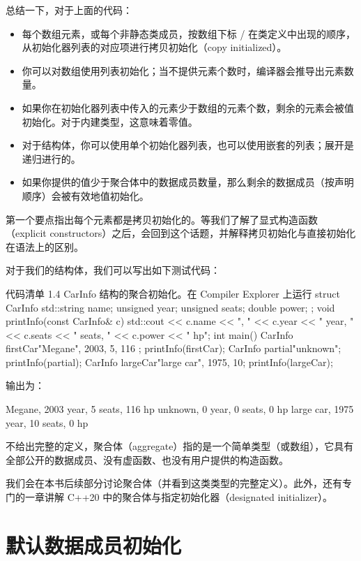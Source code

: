 总结一下，对于上面的代码：

\begin{itemize}
\item 每个数组元素，或每个非静态类成员，按数组下标 / 在类定义中出现的顺序，从初始化器列表的对应项进行拷贝初始化（copy initialized）。
\item 你可以对数组使用列表初始化；当不提供元素个数时，编译器会推导出元素数量。
\item 如果你在初始化器列表中传入的元素少于数组的元素个数，剩余的元素会被值初始化。对于内建类型，这意味着零值。
\item 对于结构体，你可以使用单个初始化器列表，也可以使用嵌套的列表；展开是递归进行的。
\item 如果你提供的值少于聚合体中的数据成员数量，那么剩余的数据成员（按声明顺序）会被有效地值初始化。
\end{itemize}

第一个要点指出每个元素都是拷贝初始化的。等我们了解了显式构造函数（explicit constructors）之后，会回到这个话题，并解释拷贝初始化与直接初始化在语法上的区别。

对于我们的结构体，我们可以写出如下测试代码：

\begin{codeboxt}[cpp]{代码清单 1.4 CarInfo 结构的聚合初始化。在 Compiler Explorer 上运行}
struct CarInfo {
std::string name;
unsigned year;
unsigned seats;
double power;
};
void printInfo(const CarInfo& c) {
std::cout << c.name << ", "
<< c.year << " year, "
<< c.seats << " seats, "
<< c.power << " hp\n";
}
int main() {
CarInfo firstCar{"Megane", 2003, 5, 116 };
printInfo(firstCar);
CarInfo partial{"unknown"};
printInfo(partial);
CarInfo largeCar{"large car", 1975, 10};
printInfo(largeCar);
}
\end{codeboxt}

输出为：

\begin{codebox}[cpp]
Megane, 2003 year, 5 seats, 116 hp
unknown, 0 year, 0 seats, 0 hp
large car, 1975 year, 10 seats, 0 hp
\end{codebox}

不给出完整的定义，聚合体（aggregate）指的是一个简单类型（或数组），它具有全部公开的数据成员、没有虚函数、也没有用户提供的构造函数。

我们会在本书后续部分讨论聚合体（并看到这类类型的完整定义）。此外，还有专门的一章讲解 C++20 中的聚合体与指定初始化器（designated initializer）。

\section{默认数据成员初始化}

